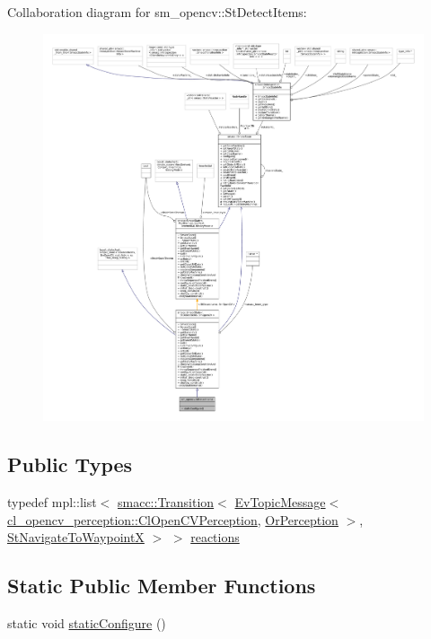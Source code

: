 Collaboration diagram for sm\+\_\+opencv\+:\+:St\+Detect\+Items\+:
\nopagebreak
\begin{figure}[H]
\begin{center}
\leavevmode
\includegraphics[width=350pt]{structsm__opencv_1_1StDetectItems__coll__graph}
\end{center}
\end{figure}
\subsection*{Public Types}
\begin{DoxyCompactItemize}
\item 
typedef mpl\+::list$<$ \hyperlink{classsmacc_1_1Transition}{smacc\+::\+Transition}$<$ \hyperlink{structsmacc_1_1default__events_1_1EvTopicMessage}{Ev\+Topic\+Message}$<$ \hyperlink{classsm__opencv_1_1cl__opencv__perception_1_1ClOpenCVPerception}{cl\+\_\+opencv\+\_\+perception\+::\+Cl\+Open\+C\+V\+Perception}, \hyperlink{classsm__opencv_1_1OrPerception}{Or\+Perception} $>$, \hyperlink{structsm__opencv_1_1StNavigateToWaypointX}{St\+Navigate\+To\+WaypointX} $>$ $>$ \hyperlink{structsm__opencv_1_1StDetectItems_a46426cacfd99b5b40485b2d68900a4d3}{reactions}
\end{DoxyCompactItemize}
\subsection*{Static Public Member Functions}
\begin{DoxyCompactItemize}
\item 
static void \hyperlink{structsm__opencv_1_1StDetectItems_a9fc42d2adb3c0cb02300233880af2c6b}{static\+Configure} ()
\end{DoxyCompactItemize}
